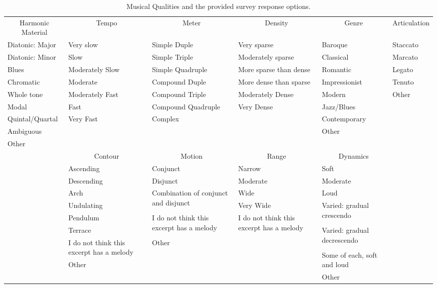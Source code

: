 \documentclass[
  english,
  man]{apa6}
\makeatletter
\newenvironment{lltable}{\begin{landscape}\begin{center}\begin{ThreePartTable}}{\end{ThreePartTable}\end{center}\end{landscape}}
\newcommand\LastLTentrywidth{1em}
\newlength\longtablewidth
\newcommand{\getlongtablewidth}{\begingroup \ifcsname LT@\roman{LT@tables}\endcsname \global\longtablewidth=0pt \renewcommand{\LT@entry}[2]{\global\advance\longtablewidth by ##2\relax\gdef\LastLTentrywidth{##2}}\@nameuse{LT@\roman{LT@tables}} \fi \endgroup}
\makeatother
\begin{document}
\begin{lltable}
\begin{scriptsize}
\begin{longtable}{p{}p{}p{}p{}p{}p{}}\noalign{\getlongtablewidth\global\LTcapwidth=\longtablewidth}
\caption{\label{tab:qualitiestable}Musical Qualities and the provided survey response options.}\\
\toprule[.8pt]
 \multicolumn{1}{c}{Harmonic Material} & \multicolumn{1}{c}{Tempo} & \multicolumn{1}{c}{Meter} & \multicolumn{1}{c}{Density} & \multicolumn{1}{c}{Genre} & \multicolumn{1}{c}{Articulation}\\
 \midrule
      Diatonic: Major & Very slow & Simple Duple & Very sparse & Baroque & Staccato \\
      Diatonic: Minor & Slow & Simple Triple & Moderately sparse & Classical & Marcato \\
      Blues & Moderately Slow & Simple Quadruple  & More sparse than dense & Romantic & Legato\\
      Chromatic & Moderate & Compound Duple & More dense than sparse & Impressionist & Tenuto\\
      Whole tone & Moderately Fast & Compound Triple & Moderately Dense & Modern & Other \\       
      Modal  & Fast & Compound Quadruple & Very Dense & Jazz/Blues & \\
      Quintal/Quartal  & Very Fast & Complex & & Contemporary & \\
      Ambiguous  & & & & Other & \\
      Other  & & & & & \\
\bottomrule\addlinespace[.5em]
 & \multicolumn{1}{c}{Contour} & \multicolumn{1}{c}{Motion} & \multicolumn{1}{c}{Range} & \multicolumn{1}{c}{Dynamics} & \\
 \cmidrule[.5pt]{2-5}
  & Ascending & Conjunct & Narrow & Soft & \\
  & Descending & Disjunct & Moderate & Moderate  & \\
  & Arch & \multirow{2}{0.2\textwidth}{Combination of conjunct and disjunct} & Wide & Loud  & \\
  & Undulating &  & Very Wide & \multirow{2}{0.2\textwidth}{Varied: gradual crescendo} &\\
  & Pendulum & \multirow{2}{0.2\textwidth}{I do not think this excerpt has a melody} & \multirow{2}{0.2\textwidth}{I do not think this excerpt has a melody} &  &\\
  & Terrace & & & \multirow{2}{0.2\textwidth}{Varied: gradual decrescendo} & \\
  & \multirow{2}{0.2\textwidth}{I do not think this excerpt has a melody} & Other & & &\\
  & & & & \multirow{2}{0.2\textwidth}{Some of each, soft and loud}   & \\
  & Other & & & & \\
  & & & & Other & \\
  
\cmidrule[.75pt]{2-5}
\end{longtable}
\end{scriptsize}
\end{lltable}
\end{document}
